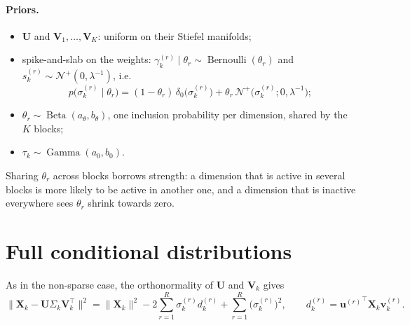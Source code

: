 \documentclass[11pt]{article}
\DeclareMathOperator{\Ga}{Gamma}
\DeclareMathOperator{\Be}{Beta}
\DeclareMathOperator{\Bern}{Bernoulli}
\newcommand{\X}{\mathbf{X}}
\newcommand{\U}{\mathbf{U}}
\newcommand{\V}{\mathbf{V}}
\newcommand{\uu}{\mathbf{u}}
\newcommand{\vv}{\mathbf{v}}
\begin{document}
\paragraph{Priors.}
\begin{itemize}
  \item $\U$ and $\V_1,\ldots,\V_K$: uniform on their Stiefel manifolds;
  \item spike-and-slab on the weights:
        $\gamma_k^{(r)}\mid\theta_r\sim\Bern(\theta_r)$ and $s_k^{(r)}\sim\mathcal N^+(0,\lambda^{-1})$, i.e.\
        \[
          p\bigl(\sigma_k^{(r)}\mid\theta_r\bigr)=(1-\theta_r)\,\delta_0\bigl(\sigma_k^{(r)}\bigr)+\theta_r\,\mathcal N^+\bigl(\sigma_k^{(r)};0,\lambda^{-1}\bigr);
        \]
  \item $\theta_r\sim\Be(a_\theta,b_\theta)$, one inclusion probability per dimension, shared by the $K$ blocks;
  \item $\tau_k\sim\Ga(a_0,b_0)$.
\end{itemize}
Sharing $\theta_r$ across blocks borrows strength: a dimension that is active in several blocks is more likely
to be active in another one, and a dimension that is inactive everywhere sees $\theta_r$ shrink towards zero.

\section{Full conditional distributions}

As in the non-sparse case, the orthonormality of $\U$ and $\V_k$ gives
\begin{equation}
  \bigl\|\X_k-\U\Sigma_k\V_k^\intercal\bigr\|^2=\|\X_k\|^2-2\sum_{r=1}^R\sigma_k^{(r)}d_k^{(r)}+\sum_{r=1}^R\bigl(\sigma_k^{(r)}\bigr)^2,
  \qquad d_k^{(r)}={\uu^{(r)}}^\intercal\X_k\vv_k^{(r)} .
  \label{eq:expand}
\end{equation}
\end{document}
